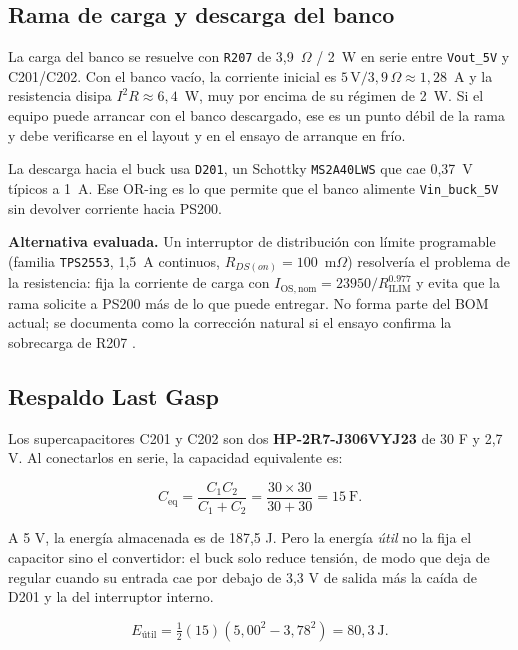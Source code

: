 \documentclass[11pt,a4paper]{article}
\begin{document}
\subsection{Rama de carga y descarga del banco}

La carga del banco se resuelve con \texttt{R207} de 3,9~$\Omega$ / 2~W en serie
entre \texttt{Vout\_5V} y C201/C202. Con el banco vacío, la corriente inicial es
$5\,\mathrm{V}/3{,}9\,\Omega \approx 1{,}28$~A y la resistencia disipa
$I^2R \approx 6{,}4$~W, muy por encima de su régimen de 2~W. Si el equipo puede
arrancar con el banco descargado, ese es un punto débil de la rama y debe
verificarse en el layout y en el ensayo de arranque en frío.

La descarga hacia el buck usa \texttt{D201}, un Schottky \texttt{MS2A40LWS} que
cae 0,37~V típicos a 1~A. Ese OR-ing es lo que permite que el banco alimente
\texttt{Vin\_buck\_5V} sin devolver corriente hacia PS200.

\noindent\textbf{Alternativa evaluada.} Un interruptor de distribución con
límite programable (familia \texttt{TPS2553}, 1,5~A continuos,
$R_{DS(on)}=100$~m$\Omega$) resolvería el problema de la resistencia: fija la
corriente de carga con $I_{\mathrm{OS,nom}} = 23950/R_{\mathrm{ILIM}}^{0.977}$ y
evita que la rama solicite a PS200 más de lo que puede entregar. No forma parte
del BOM actual; se documenta como la corrección natural si el ensayo confirma la
sobrecarga de R207 \cite{tps2553}.

\subsection{Respaldo Last Gasp}

Los supercapacitores C201 y C202 son dos \textbf{HP-2R7-J306VYJ23} de 30 F y
2,7 V. Al conectarlos en serie, la capacidad equivalente es:

\begin{equation}
C_{\mathrm{eq}} = \frac{C_1 C_2}{C_1 + C_2} = \frac{30 \times 30}{30 + 30} = 15\ \mathrm{F}.
\end{equation}

A 5 V, la energía almacenada es de 187,5 J. Pero la energía \emph{útil} no la
fija el capacitor sino el convertidor: el buck solo reduce tensión, de modo que
deja de regular cuando su entrada cae por debajo de 3,3 V de salida más la
caída de D201 y la del interruptor interno.

\begin{equation}
E_{\mathrm{útil}} = \tfrac{1}{2}(15)\left(5{,}00^2 - 3{,}78^2\right)
= 80{,}3\ \mathrm{J}.
\end{equation}
\end{document}
